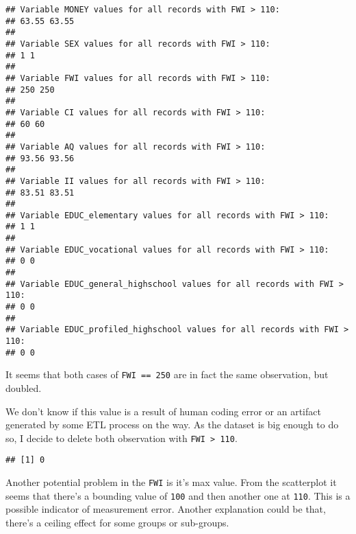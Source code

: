 \documentclass[]{article}
\newenvironment{Shaded}{\begin{snugshade}}{\end{snugshade}}
\newcommand{\CommentTok}[1]{\textcolor[rgb]{0.56,0.35,0.01}{\textit{#1}}}
\newcommand{\DecValTok}[1]{\textcolor[rgb]{0.00,0.00,0.81}{#1}}
\newcommand{\KeywordTok}[1]{\textcolor[rgb]{0.13,0.29,0.53}{\textbf{#1}}}
\newcommand{\NormalTok}[1]{#1}
\newcommand{\OperatorTok}[1]{\textcolor[rgb]{0.81,0.36,0.00}{\textbf{#1}}}
\newcommand{\StringTok}[1]{\textcolor[rgb]{0.31,0.60,0.02}{#1}}
\begin{document}
\begin{verbatim}
## Variable MONEY values for all records with FWI > 110:
## 63.55 63.55
## 
## Variable SEX values for all records with FWI > 110:
## 1 1
## 
## Variable FWI values for all records with FWI > 110:
## 250 250
## 
## Variable CI values for all records with FWI > 110:
## 60 60
## 
## Variable AQ values for all records with FWI > 110:
## 93.56 93.56
## 
## Variable II values for all records with FWI > 110:
## 83.51 83.51
## 
## Variable EDUC_elementary values for all records with FWI > 110:
## 1 1
## 
## Variable EDUC_vocational values for all records with FWI > 110:
## 0 0
## 
## Variable EDUC_general_highschool values for all records with FWI > 110:
## 0 0
## 
## Variable EDUC_profiled_highschool values for all records with FWI > 110:
## 0 0
\end{verbatim}

It seems that both cases of \texttt{FWI\ ==\ 250} are in fact the same
observation, but doubled.

We don't know if this value is a result of human coding error or an
artifact generated by some ETL process on the way. As the dataset is big
enough to do so, I decide to delete both observation with
\texttt{FWI\ \textgreater{}\ 110}.

\begin{Shaded}
\end{Shaded}

\begin{Shaded}
\end{Shaded}

\begin{verbatim}
## [1] 0
\end{verbatim}

Another potential problem in the \texttt{FWI} is it's max value. From
the scatterplot it seems that there's a bounding value of \texttt{100}
and then another one at \texttt{110}. This is a possible indicator of
measurement error. Another explanation could be that, there's a ceiling
effect for some groups or sub-groups.
\end{document}
